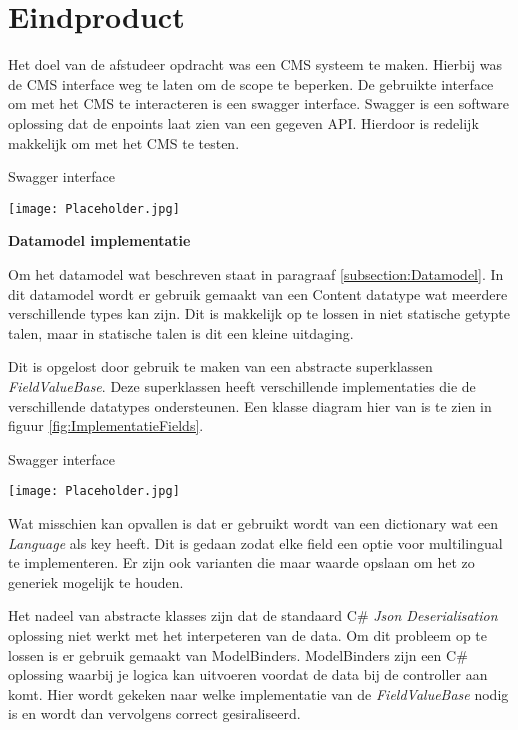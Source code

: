 \section{Eindproduct}
Het doel van de afstudeer opdracht was een CMS systeem te maken.
Hierbij was de CMS interface weg te laten om de scope te beperken.
De gebruikte interface om met het CMS te interacteren is een swagger interface.
Swagger is een software oplossing dat de enpoints laat zien van een gegeven API.
Hierdoor is redelijk makkelijk om met het CMS te testen. 

\whitespace
\begin{graphic}
    \captionsetup{type=figure}
    \caption{Swagger interface}
    \texttt{[image: Placeholder.jpg]}
    \label{fig:SwaggerApi}
\end{graphic}

\whitespace
\textbf{Datamodel implementatie}

\whitespace
Om het datamodel wat beschreven staat in paragraaf \ref{subsection:Datamodel}.
In dit datamodel wordt er gebruik gemaakt van een Content datatype wat meerdere verschillende types kan zijn.
Dit is makkelijk op te lossen in niet statische getypte talen, maar in statische talen is dit een kleine uitdaging.

\whitespace
Dit is opgelost door gebruik te maken van een abstracte superklassen \textit{FieldValueBase}.
Deze superklassen heeft verschillende implementaties die de verschillende datatypes ondersteunen.
Een klasse diagram hier van is te zien in figuur \ref{fig:ImplementatieFields}.

\whitespace
\begin{graphic}
    \captionsetup{type=figure}
    \caption{Swagger interface}
    \texttt{[image: Placeholder.jpg]}
    \label{fig:ImplementatieFields}
\end{graphic}

Wat misschien kan opvallen is dat er gebruikt wordt van een dictionary wat een \textit{Language} als key heeft.
Dit is gedaan zodat elke field een optie voor multilingual te implementeren.
Er zijn ook varianten die maar waarde opslaan om het zo generiek mogelijk te houden.

\whitespace
Het nadeel van abstracte klasses zijn dat de standaard C\# \textit{Json Deserialisation} oplossing niet werkt met het interpeteren van de data.
Om dit probleem op te lossen is er gebruik gemaakt van ModelBinders.
ModelBinders zijn een C\# oplossing waarbij je logica kan uitvoeren voordat de data bij de controller aan komt.
Hier wordt gekeken naar welke implementatie van de \textit{FieldValueBase} nodig is en wordt dan vervolgens correct gesiraliseerd.


